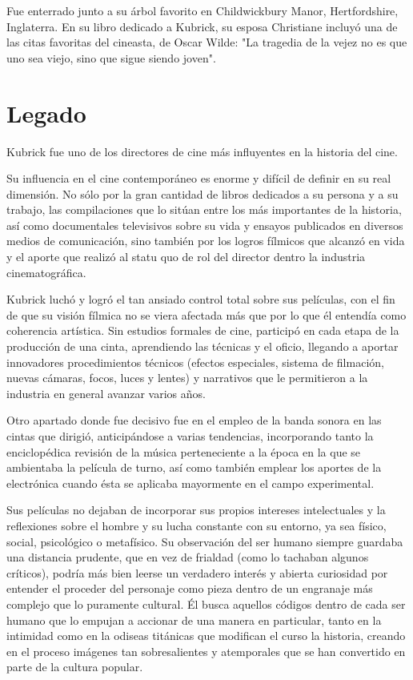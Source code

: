 \documentclass[12pt,a4paper]{article}
\begin{document}
Fue enterrado junto a su árbol favorito en Childwickbury Manor, Hertfordshire, Inglaterra. En su libro dedicado a Kubrick, su esposa Christiane incluyó una de las citas favoritas del cineasta, de Oscar Wilde: "La tragedia de la vejez no es que uno sea viejo, sino que sigue siendo joven".
\section{Legado}
Kubrick fue uno de los directores de cine más influyentes en la historia del cine.

Su influencia en el cine contemporáneo es enorme y difícil de definir en su real dimensión. No sólo por la gran cantidad de libros dedicados a su persona y a su trabajo, las compilaciones que lo sitúan entre los más importantes de la historia, así como documentales televisivos sobre su vida y ensayos publicados en diversos medios de comunicación, sino también por los logros fílmicos que alcanzó en vida y el aporte que realizó al statu quo de rol del director dentro la industria cinematográfica.

Kubrick luchó y logró el tan ansiado control total sobre sus películas, con el fin de que su visión fílmica no se viera afectada más que por lo que él entendía como coherencia artística. Sin estudios formales de cine, participó en cada etapa de la producción de una cinta, aprendiendo las técnicas y el oficio, llegando a aportar innovadores procedimientos técnicos (efectos especiales, sistema de filmación, nuevas cámaras, focos, luces y lentes) y narrativos que le permitieron a la industria en general avanzar varios años.

Otro apartado donde fue decisivo fue en el empleo de la banda sonora en las cintas que dirigió, anticipándose a varias tendencias, incorporando tanto la enciclopédica revisión de la música perteneciente a la época en la que se ambientaba la película de turno, así como también emplear los aportes de la electrónica cuando ésta se aplicaba mayormente en el campo experimental.

Sus películas no dejaban de incorporar sus propios intereses intelectuales y la reflexiones sobre el hombre y su lucha constante con su entorno, ya sea físico, social, psicológico o metafísico. Su observación del ser humano siempre guardaba una distancia prudente, que en vez de frialdad (como lo tachaban algunos críticos), podría más bien leerse un verdadero interés y abierta curiosidad por entender el proceder del personaje como pieza dentro de un engranaje más complejo que lo puramente cultural. Él busca aquellos códigos dentro de cada ser humano que lo empujan a accionar de una manera en particular, tanto en la intimidad como en la odiseas titánicas que modifican el curso la historia, creando en el proceso imágenes tan sobresalientes y atemporales que se han convertido en parte de la cultura popular.
\end{document}
